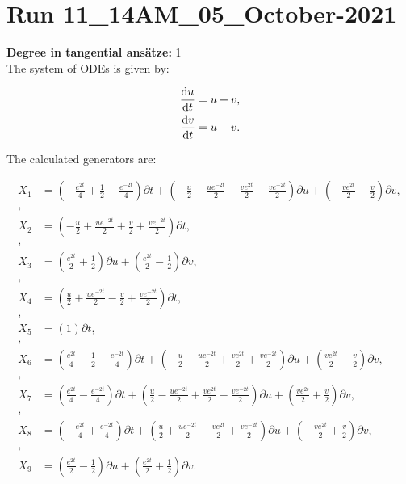 \section*{Run 11\_14AM\_05\_October-2021}
\textbf{Degree in tangential ansätze:}	1\\
The system of ODEs is given by:

\begin{align*}
\dv{u}{t}&=u + v,\\
\dv{v}{t}&=u + v.\\
\end{align*}

\noindent The calculated generators are:

\begin{align*}
X_{1}&=\left( - \frac{e^{2 t}}{4} + \frac{1}{2} - \frac{e^{- 2 t}}{4} \right)\partial t+\left( - \frac{u}{2} - \frac{u e^{- 2 t}}{2} - \frac{v e^{2 t}}{2} - \frac{v e^{- 2 t}}{2} \right)\partial u+\left( - \frac{v e^{2 t}}{2} - \frac{v}{2} \right)\partial v,\\
,\\
X_{2}&=\left( - \frac{u}{2} + \frac{u e^{- 2 t}}{2} + \frac{v}{2} + \frac{v e^{- 2 t}}{2} \right)\partial t,\\
,\\
X_{3}&=\left( \frac{e^{2 t}}{2} + \frac{1}{2} \right)\partial u+\left( \frac{e^{2 t}}{2} - \frac{1}{2} \right)\partial v,\\
,\\
X_{4}&=\left( \frac{u}{2} + \frac{u e^{- 2 t}}{2} - \frac{v}{2} + \frac{v e^{- 2 t}}{2} \right)\partial t,\\
,\\
X_{5}&=\left( 1 \right)\partial t,\\
,\\
X_{6}&=\left( \frac{e^{2 t}}{4} - \frac{1}{2} + \frac{e^{- 2 t}}{4} \right)\partial t+\left( - \frac{u}{2} + \frac{u e^{- 2 t}}{2} + \frac{v e^{2 t}}{2} + \frac{v e^{- 2 t}}{2} \right)\partial u+\left( \frac{v e^{2 t}}{2} - \frac{v}{2} \right)\partial v,\\
,\\
X_{7}&=\left( \frac{e^{2 t}}{4} - \frac{e^{- 2 t}}{4} \right)\partial t+\left( \frac{u}{2} - \frac{u e^{- 2 t}}{2} + \frac{v e^{2 t}}{2} - \frac{v e^{- 2 t}}{2} \right)\partial u+\left( \frac{v e^{2 t}}{2} + \frac{v}{2} \right)\partial v,\\
,\\
X_{8}&=\left( - \frac{e^{2 t}}{4} + \frac{e^{- 2 t}}{4} \right)\partial t+\left( \frac{u}{2} + \frac{u e^{- 2 t}}{2} - \frac{v e^{2 t}}{2} + \frac{v e^{- 2 t}}{2} \right)\partial u+\left( - \frac{v e^{2 t}}{2} + \frac{v}{2} \right)\partial v,\\
,\\
X_{9}&=\left( \frac{e^{2 t}}{2} - \frac{1}{2} \right)\partial u+\left( \frac{e^{2 t}}{2} + \frac{1}{2} \right)\partial v.\\
\end{align*}
